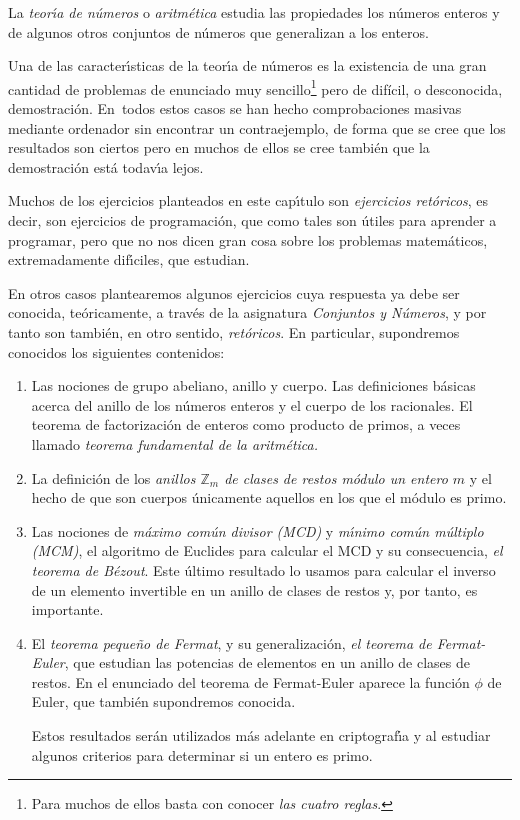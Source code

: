 La {\itshape teor\'{\i}a de n\'umeros} o {\itshape aritm\'etica} estudia las
propiedades los n\'umeros enteros y  de algunos otros conjuntos de n\'umeros
que generalizan a los enteros. 

Una de las caracter\'{\i}sticas de la teor\'{\i}a de n\'umeros es la existencia
de una gran cantidad de {\sc problemas de enunciado muy sencillo\footnote{Para
muchos
de ellos basta con conocer {\itshape las cuatro reglas}.}
pero de difícil, o desconocida, demostración}.
En~todos estos casos se han hecho comprobaciones masivas mediante ordenador  sin
encontrar un contraejemplo, de forma que se cree que los resultados son ciertos
pero en muchos de ellos se cree tambi\'en que la demostraci\'on est\'a
todav\'{\i}a lejos.


Muchos de los ejercicios planteados en este cap\'{\i}tulo son
{\itshape ejercicios ret\'oricos}, es decir, son ejercicios de programaci\'on,
que como tales son \'utiles para aprender a programar, pero que no nos dicen
gran cosa sobre los problemas matem\'aticos, extremadamente dif\'{\i}ciles, que
estudian. 


En otros casos plantearemos algunos ejercicios cuya respuesta ya debe ser
conocida, te\'oricamente, a trav\'es de 
la asignatura {\itshape Conjuntos y
N\'umeros}, y por tanto son tambi\'en, en otro sentido, {\itshape ret\'oricos}.
En particular,  supondremos conocidos los siguientes contenidos:

\begin{enumerate}
 \item Las nociones de grupo abeliano, anillo y cuerpo. Las definiciones
b\'asicas acerca del anillo de los n\'umeros enteros y el cuerpo de los
racionales. El teorema de factorizaci\'on de enteros como producto de primos, a
veces llamado {\itshape teorema fundamental de la aritm\'etica.} 
 
 \item La definici\'on de los {\itshape anillos $\mathbb{Z}_m$ de clases de
restos m\'odulo un entero $m$} y el hecho de que son cuerpos \'unicamente
aquellos en los que
el m\'odulo es primo. 

\item Las nociones de {\itshape m\'aximo com\'un divisor (MCD)} y {\itshape
m\'{\i}nimo com\'un m\'ultiplo (MCM)}, el algoritmo de Euclides para calcular el
MCD y su consecuencia, {\itshape el teorema de Bézout}. Este \'ultimo resultado
lo usamos para calcular el inverso de un elemento invertible en un anillo de
clases de restos y, por tanto,  es importante.

\item El {\itshape teorema peque\~no de Fermat}, y su generalizaci\'on,
{\itshape el teorema de Fermat-Euler},  que estudian las potencias de elementos
en un anillo de clases de restos. En el enunciado del teorema de Fermat-Euler
aparece la funci\'on $\phi$ de Euler, que tambi\'en supondremos conocida.


Estos resultados ser\'an utilizados m\'as
adelante en criptograf\'{\i}a y al estudiar algunos criterios para determinar si
un entero es primo.
 
\end{enumerate}




